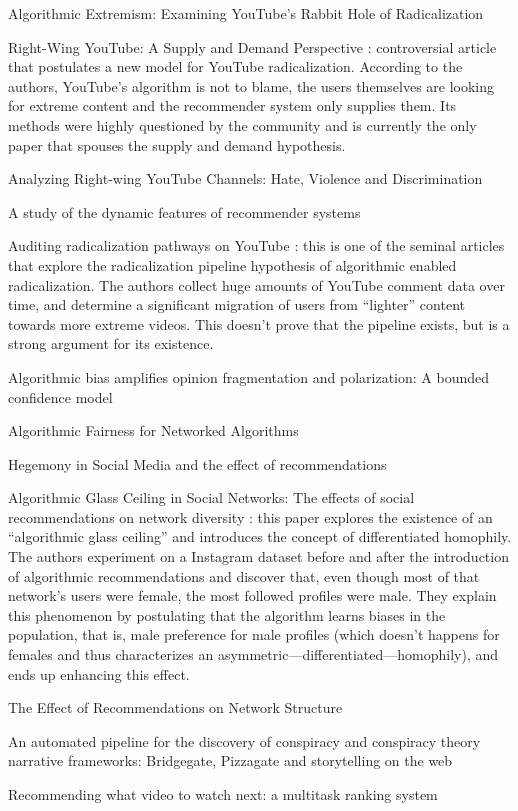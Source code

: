 Algorithmic Extremism: Examining YouTube's Rabbit Hole of Radicalization
\citet{ledwich_algorithmic_2019}

Right-Wing YouTube: A Supply and Demand Perspective
\citet{munger_right-wing_2020}: controversial article that postulates a new
model for YouTube radicalization. According to the authors, YouTube's algorithm
is not to blame, the users themselves are looking for extreme content and the
recommender system only supplies them. Its methods were highly questioned by the
community and is currently the only paper that spouses the supply and demand
hypothesis.

Analyzing Right-wing YouTube Channels: Hate, Violence and Discrimination
\citet{ottoni_analyzing_2018}

A study of the dynamic features of recommender systems \citet{rana_study_2012}

Auditing radicalization pathways on YouTube \citet{ribeiro_auditing_2020}: this
is one of the seminal articles that explore the radicalization pipeline
hypothesis of algorithmic enabled radicalization. The authors collect huge
amounts of YouTube comment data over time, and determine a significant migration
of users from ``lighter'' content towards more extreme videos. This doesn't
prove that the pipeline exists, but is a strong argument for its existence.

Algorithmic bias amplifies opinion fragmentation and polarization: A bounded
confidence model \citet{sirbu_algorithmic_2019}

Algorithmic Fairness for Networked Algorithms \citet{stoica_algorithmic_2020}

Hegemony in Social Media and the effect of recommendations
\citet{stoica_hegemony_2019}

Algorithmic Glass Ceiling in Social Networks: The effects of social
recommendations on network diversity \citet{stoica_algorithmic_2018}: this paper
explores the existence of an ``algorithmic glass ceiling'' and introduces the
concept of differentiated homophily. The authors experiment on a Instagram
dataset before and after the introduction of algorithmic recommendations and
discover that, even though most of that network's users were female, the most
followed profiles were male. They explain this phenomenon by postulating that
the algorithm learns biases in the population, that is, male preference for male
profiles (which doesn't happens for females and thus characterizes an
asymmetric---differentiated---homophily), and ends up enhancing this effect.

The Effect of Recommendations on Network Structure \citet{su_effect_2016}

An automated pipeline for the discovery of conspiracy and conspiracy theory
narrative frameworks: Bridgegate, Pizzagate and storytelling on the web
\citet{tangherlini_automated_2020}

Recommending what video to watch next: a multitask ranking system
\citet{zhao_recommending_2019}
